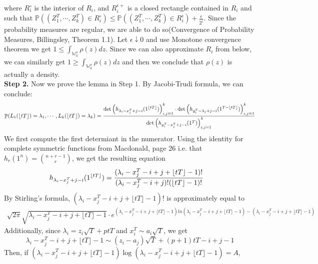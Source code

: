 \documentclass[12pt]{article}
\DeclareMathOperator{\pr}{\mathbb{P}}
\DeclarePairedDelimiter\floor{\lfloor}{\rfloor}
\begin{document}
where $R^{\circ}_{i}$ is the interior of $R_{i}$, and $R_{i}^{\epsilon+}$ is a closed rectangle contained in $R_{i}$ and such that $\mathbb{P}((Z_{1}^{T},\cdots,Z_{k}^{T})\in R_{i}^{\circ})\leqslant \mathbb{P}((Z_{1}^{T},\cdots,Z_{k}^{T})\in R_{i}^{\epsilon})+\frac{\epsilon}{2^{i}}$. Since the probability measures are regular, we are able to do so(Convergence of Probability Measures, Billingsley, Theorem 1.1). Let $\epsilon\downarrow 0$ and use Monotone convergence theorem we get $1\leqslant \int_{\mathbb{W}_{k}^{o}}\rho(z)dz$. Since we can also approximate $R_{i}$ from below, we can similarly get $1\geqslant \int_{\mathbb{W}_{k}^{o}}\rho(z)dz$ and then we conclude that $\rho(z)$ is actually a density.\\

\textbf{Step 2. }Now we prove the lemma in Step 1.
By Jacobi-Trudi formula, we can conclude:
\begin{align*}
\pr(L_1(\lfloor tT\rfloor)=\lambda_1,\cdots, L_k(\lfloor tT\rfloor)=\lambda_k)=\frac{\det\left(h_{\lambda_i-x_j^T+j-i}(1^{\floor{tT}})\right)_{i,j=1}^k\cdot\det\left(h_{y_i^T-\lambda_j+j-i}(1^{T-\floor{tT}})\right)_{i,j=1}^k}{\det\left(h_{y_i^{T}-x_j^T+j-i}(1^T)\right)_{i,j=1}^k}	
\end{align*}
We first compute the first determiant in the numerator. Using the identity for complete symmetric functions from Macdonald, page 26 i.e. that $h_r(1^n)=\binom{n+r-1}{r}$, we get the resulting equation 
\begin{align*}
h_{\lambda_i-x_j^T+j-i}(1^{\floor{tT}})&=\frac{(\lambda_{i}-x_{j}^{T}-i+j+\lfloor tT \rfloor -1)!}{(\lambda_{i}-x_{j}^{T}-i+j)!(\lfloor tT \rfloor -1)!}
\end{align*}
By Stirling's formula, $(\lambda_{i}-x_{j}^{T}-i+j+\lfloor tT \rfloor -1)!$ is approximately equal to
\begin{align*}
\sqrt{2\pi}\sqrt{\lambda_{i}-x_{j}^{T}-i+j+\lfloor tT \rfloor -1}\cdot  e^{(\lambda_{i}-x_{j}^{T}-i+j+\lfloor tT \rfloor -1)ln(\lambda_{i}-x_{j}^{T}-i+j+\lfloor tT \rfloor -1)-(\lambda_{i}-x_{j}^{T}-i+j+\lfloor tT \rfloor -1)}
\end{align*}
Additionally, since $\lambda_{i}=z_{i}\sqrt{T}+ptT$ and $x_{i}^{T}\sim a_{i}\sqrt{T}$, we get \[\lambda_{i}-x_{j}^{T}-i+j+\lfloor tT \rfloor -1\sim (z_{i}-a_{j})\sqrt{T} + (p+1)tT-i+j-1\]
Then,	if $(\lambda_{i}-x_{j}^{T}-i+j+\lfloor tT \rfloor -1)\log(\lambda_{i}-x_{j}^{T}-i+j+\lfloor tT \rfloor -1)=A$,
\end{document}
